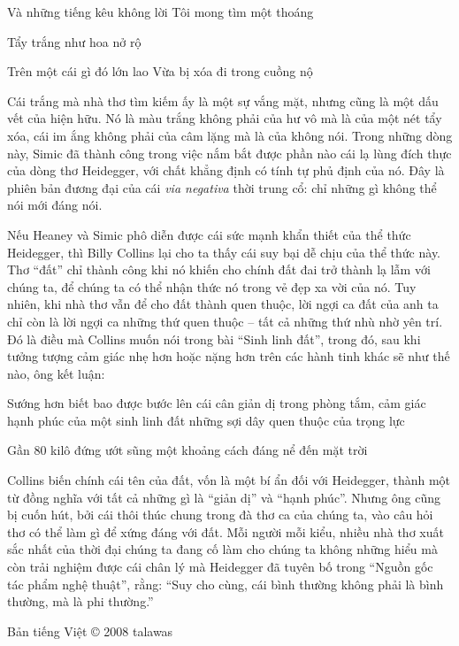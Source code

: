 \documentclass[../main.tex]{subfiles}
\begin{document}
\begin{multicols}{2}
\begin{blockquote}
Và những tiếng kêu không lời 
Tôi mong tìm một thoáng 

Tẩy trắng 
như hoa nở rộ 

Trên một cái gì đó lớn lao 
Vừa bị xóa đi trong cuồng nộ 

\end{blockquote}


Cái trắng mà nhà thơ tìm kiếm ấy là một sự vắng mặt, nhưng cũng là một dấu vết của hiện hữu. Nó là màu trắng không phải của hư vô mà là của một nét tẩy xóa, cái im ắng không phải của câm lặng mà là của không nói. Trong những dòng này, Simic đã thành công trong việc nắm bắt được phần nào cái lạ lùng đích thực của dòng thơ Heidegger, với chất khẳng định có tính tự phủ định của nó. Đây là phiên bản đương đại của cái \textit{via negativa }thời trung cổ: chỉ những gì không thể nói mới đáng nói. 

Nếu Heaney và Simic phô diễn được cái sức mạnh khẩn thiết của thể thức Heidegger, thì Billy Collins lại cho ta thấy cái suy bại dễ chịu của thể thức này. Thơ “đất” chỉ thành công khi nó khiến cho chính đất đai trở thành lạ lẫm với chúng ta, để chúng ta có thể nhận thức nó trong vẻ đẹp xa vời của nó. Tuy nhiên, khi nhà thơ vẫn để cho đất thành quen thuộc, lời ngợi ca đất của anh ta chỉ còn là lời ngợi ca những thứ quen thuộc – tất cả những thứ nhù nhờ yên trí. Đó là điều mà Collins muốn nói trong bài “Sinh linh đất”, trong đó, sau khi tưởng tượng cảm giác nhẹ hơn hoặc nặng hơn trên các hành tinh khác sẽ như thế nào, ông kết luận: 
\begin{blockquote}


Sướng hơn biết bao được bước lên 
cái cân giản dị trong phòng tắm, 
cảm giác hạnh phúc của một sinh linh đất 
những sợi dây quen thuộc của trọng lực 

Gần 80 kilô đứng ướt sũng 
một khoảng cách đáng nể đến mặt trời 

\end{blockquote}


Collins biến chính cái tên của đất, vốn là một bí ẩn đối với Heidegger, thành một từ đồng nghĩa với tất cả những gì là “giản dị” và “hạnh phúc”. Nhưng ông cũng bị cuốn hút, bởi cái thôi thúc chung trong đà thơ ca của chúng ta, vào câu hỏi thơ có thể làm gì để xứng đáng với đất. Mỗi người mỗi kiểu, nhiều nhà thơ xuất sắc nhất của thời đại chúng ta đang cố làm cho chúng ta không những hiểu mà còn trải nghiệm được cái chân lý mà Heidegger đã tuyên bố trong “Nguồn gốc tác phẩm nghệ thuật”, rằng: “Suy cho cùng, cái bình thường không phải là bình thường, mà là phi thường.” 

Bản tiếng Việt © 2008 talawas 




\end{multicols}
\end{document}
